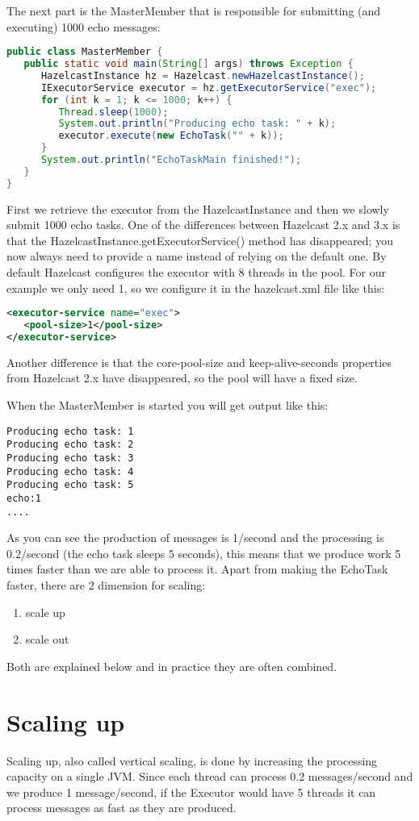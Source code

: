 The next part is the MasterMember that is responsible for submitting (and executing) 1000 echo messages:
\begin{lstlisting}[language=java]
public class MasterMember {
   public static void main(String[] args) throws Exception {
      HazelcastInstance hz = Hazelcast.newHazelcastInstance();
      IExecutorService executor = hz.getExecutorService("exec");
      for (int k = 1; k <= 1000; k++) {
         Thread.sleep(1000);
         System.out.println("Producing echo task: " + k);
         executor.execute(new EchoTask("" + k));
      }
      System.out.println("EchoTaskMain finished!");
   }
}
\end{lstlisting}
First we retrieve the executor from the HazelcastInstance and then we slowly submit 1000 echo tasks. One of the differences between Hazelcast 2.x and 3.x is that the HazelcastInstance.getExecutorService() method has disappeared; you now always need to provide a name instead of relying on the default one. By default Hazelcast configures the executor with 8 threads in the pool. For our example we only need 1, so we configure it in the hazelcast.xml file like this:
\begin{lstlisting}[language=xml]
<executor-service name="exec">
   <pool-size>1</pool-size>
</executor-service>
\end{lstlisting}
Another difference is that the core-pool-size and keep-alive-seconds properties from Hazelcast 2.x have disappeared, so the pool will have a fixed size.

When the MasterMember is started you will get output like this:
\begin{lstlisting}
Producing echo task: 1
Producing echo task: 2
Producing echo task: 3
Producing echo task: 4
Producing echo task: 5
echo:1
....
\end{lstlisting}
As you can see the production of messages is 1/second and the processing is 0.2/second (the echo task sleeps 5 seconds), this means that we produce work 5 times faster than we are able to process it. Apart from making the EchoTask faster, there are 2 dimension for scaling:
\begin{enumerate}
\item scale up 
\item scale out
\end{enumerate}
Both are explained below and in practice they are often combined. 

\section{Scaling up}
Scaling up, also called vertical scaling, is done by increasing the processing capacity on a single JVM. Since each thread can process 0.2 messages/second and we produce 1 message/second, if the Executor would have 5 threads it can process messages as fast as they are produced.

